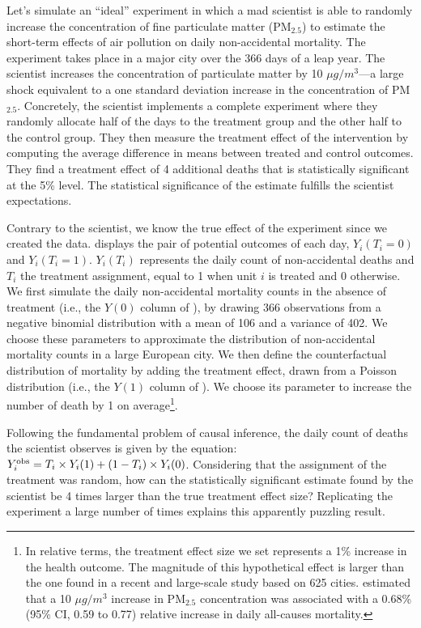 \documentclass[12pt]{article}
\begin{document}
    Let's simulate an ``ideal'' experiment in which a mad scientist is able to randomly increase the concentration of fine particulate matter (PM$_{2.5}$) to estimate the short-term effects of air pollution on daily non-accidental mortality. The experiment takes place in a major city over the 366 days of a leap year. The scientist increases the concentration of particulate matter by 10 $\mu g /m^3$---a large shock equivalent to a one standard deviation increase in the concentration of PM$_{2.5}$. Concretely, the scientist implements a complete experiment where they randomly allocate half of the days to the treatment group and the other half to the control group. They then measure the treatment effect of the intervention by computing the average difference in means between treated and control outcomes. They find a treatment effect of 4 additional deaths that is statistically significant at the 5\% level. The statistical significance of the estimate fulfills the scientist expectations.

    Contrary to the scientist, we know the true effect of the experiment since we created the data.  displays the pair of potential outcomes of each day, $Y_{i}(T_{i}=0)$ and $Y_{i}(T_{i}=1)$. $Y_{i}(T_{i})$ represents the daily count of non-accidental deaths and $T_{i}$ the treatment assignment, equal to 1 when unit $i$ is treated and 0 otherwise. We first simulate the daily non-accidental mortality counts in the absence of treatment (i.e., the $Y(0)$ column of ), by drawing 366 observations from a negative binomial distribution with a mean of 106 and a variance of 402. We choose these parameters to approximate the distribution of non-accidental mortality counts in a large European city. We then define the counterfactual distribution of mortality by adding the treatment effect, drawn from a Poisson distribution (i.e., the $Y(1)$ column of ). We choose its parameter to increase the number of death by 1 on average\footnote{In relative terms, the treatment effect size we set represents a 1\% increase in the health outcome. The magnitude of this hypothetical effect is larger than the one found in a recent and large-scale study based on 625 cities. \cite{liu_ambient_2019} estimated that a 10 $\mu g /m^3$ increase in $\text{PM}_{2.5}$ concentration was associated with a 0.68\% (95\% CI, 0.59 to 0.77) relative increase in daily all-causes mortality.}.

    

    Following the fundamental problem of causal inference, the daily count of deaths the scientist observes is given by the equation: $Y_{i}^{\textnormal{obs}} = T_{i} \times Y_{i}(1) + (1-T_{i})\times Y_{i}(0)$. Considering that the assignment of the treatment was random, how can the statistically significant estimate found by the scientist be 4 times larger than the true treatment effect size? Replicating the experiment a large number of times explains this apparently puzzling result.
   
\end{document}

